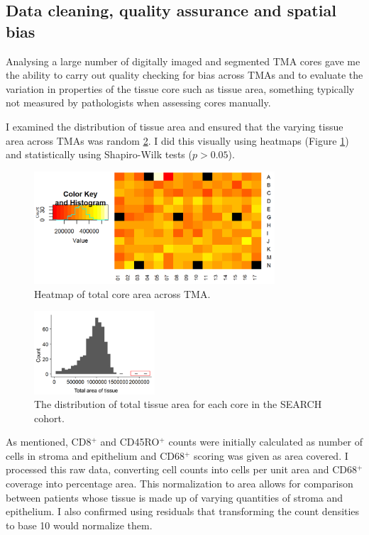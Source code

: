  \subsection{Data cleaning, quality assurance and spatial bias}

Analysing a large number of digitally imaged and segmented TMA cores gave me the ability to carry out quality checking for bias across TMAs and to evaluate the variation in properties of the tissue core such as tissue area, something typically not measured by pathologists when assessing cores manually.

I examined the distribution of tissue area and ensured that the varying tissue area across TMAs was random \ref{fig:area_dist}. I did this visually using heatmaps (Figure \ref{fig:heatmap_area}) and statistically using Shapiro-Wilk tests ($p > 0.05 $). 

\begin{figure}
    \centering
    \includegraphics[width=0.8\textwidth]{Chapter2/Figs/Raster/area_heatmap.png}
    \caption{Heatmap of total core area across TMA.}
    \label{fig:heatmap_area}
\end{figure}

\begin{figure}
    \centering
    \includegraphics[width=0.4\textwidth]{Chapter2/Figs/Raster/Area_distribution_hist.png}
    \caption{The distribution of total tissue area for each core in the SEARCH cohort.}
    \label{fig:area_dist}
\end{figure}
 
As mentioned, CD8$^+$ and CD45RO$^+$ counts were initially calculated as number of cells in stroma and epithelium and CD68$^+$ scoring was given as area covered. I processed this raw data, converting cell counts into cells per unit area and CD68$^+$ coverage into percentage area. This normalization to area allows for comparison between patients whose tissue is made up of varying quantities of stroma and epithelium. I also confirmed using  residuals that transforming the count densities to base 10 would normalize them.


